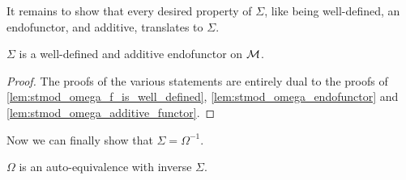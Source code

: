 It remains to show that every desired property of \( \Sigma \), like being well-defined, an endofunctor, and additive, translates to \( \Sigma \).
\begin{lemma}
    \label{lem:stmod_sigma_well-defined_additive_endofunctor}
    \( \Sigma \) is a well-defined and additive endofunctor on \( {\mathcal{M}} \).
\end{lemma}
\begin{proof}
    The proofs of the various statements are entirely dual to the proofs of \autoref{lem:stmod_omega_f_is_well_defined}, \autoref{lem:stmod_omega_endofunctor} and \autoref{lem:stmod_omega_additive_functor}.
\end{proof}

Now we can finally show that \( \Sigma = \Omega^{-1} \).

\begin{theorem}
    \label{thm:stmod_omega_autoeq}
    \( \Omega \) is an auto-equivalence with inverse \( \Sigma \).
\end{theorem}
